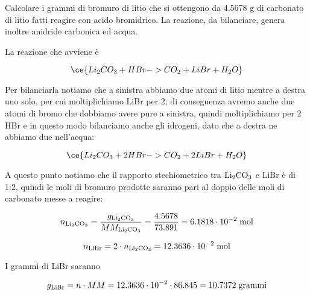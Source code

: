 \newpage

\begin{esercizio}
    Calcolare i grammi di bromuro di litio che si ottengono da 4.5678 g di carbonato di litio fatti reagire con acido bromidrico. La reazione, da bilanciare, genera inoltre anidride carbonica ed acqua.
\end{esercizio}
\begin{soluzione}
    La reazione che avviene è

$$\ce{Li_2CO_3 + HBr -> CO_2 + LiBr + H_2O}$$

Per bilanciarla notiamo che a sinistra abbiamo due atomi di litio mentre a destra uno solo, per cui moltiplichiamo LiBr per 2; di conseguenza avremo anche due atomi di bromo che dobbiamo avere pure a sinistra, quindi moltiplichiamo per 2 HBr e in questo modo bilanciamo anche gli idrogeni, dato che a destra ne abbiamo due nell'acqua:

$$\ce{Li_2CO_3 + 2HBr -> CO_2 + 2LiBr + H_2O}$$

A questo punto notiamo che il rapporto stechiometrico tra $\rm Li_2CO_3$ e LiBr è di 1:2, quindi le moli di bromuro prodotte saranno pari al doppio delle moli di carbonato messe a reagire:

$$n_{\rm Li_2CO_3}
=\frac{g_{\rm Li_2CO_3}}{MM_{\rm Li_2CO_3}}
=\frac{4.5678}{73.891}=6.1818 \cdot 10^{-2} \; \rm mol$$

$$n_{\rm LiBr}=2 \cdot n_{\rm Li_2CO_3}=12.3636 \cdot 10^{-2} \; \rm mol$$

I grammi di LiBr saranno

$$g_{\rm LiBr}=n \cdot MM=12.3636 \cdot 10^{-2} \cdot 86.845
=10.7372 \; \rm grammi$$

\end{soluzione}

\newpage

